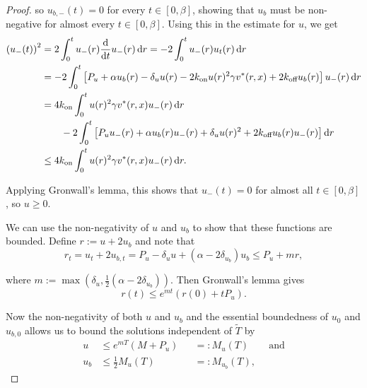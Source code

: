 \begin{proof}
    \noindent
    so $u_{b,-}(t) = 0$ for every $t \in [0, \beta]$, showing that $u_b$ must be non-negative for almost every $t \in [0, \beta]$. Using this in the estimate for $u$, we get
%
    \begin{align*}
        \left( u_{-}(t) \right)^2 &= 2 \int_{0}^{t} u_{-}(r) \frac{\d}{\d t} u_{-}(r)\d r = - 2 \int_{0}^{t} u_{-}(r) u_{t}(r) \d r \\
        &= - 2 \int_{0}^{t} \left[ P_{u} + \alpha u_b(r) - \delta_{u} u(r) - 2 \kon u(r)^2 \gamma v^*(r, x) + 2 \koff u_b(r) \right] u_{-}(r) \d r \\
        &= 4 \kon \int_{0}^{t} u(r)^2 \gamma v^*(r, x)u_{-}(r) \d r \\
        & \qquad - 2 \int_{0}^{t} \left[ P_{u} u_{-}(r) + \alpha u_b(r) u_{-}(r) + \delta_{u} u(r)^2 + 2 \koff u_b(r)u_{-}(r) \right] \d r \\
        &\leq 4 \kon \int_{0}^{t} u(r)^2 \gamma v^*(r, x)u_{-}(r) \d r.
    \end{align*}

    \noindent
    Applying Gronwall's lemma, this shows that $u_-(t) = 0$ for almost all $t \in [0, \beta]$, so $u \geq 0$.
    
    We can use the non-negativity of $u$ and $u_b$ to show that these functions are bounded. Define $r := u + 2 u_b$ and note that
%
    \begin{equation*}
        r_t = u_t + 2 u_{b, t} = P_u - \delta_u u + (\alpha - 2 \delta_{u_b}) u_b \leq P_u + m r,
    \end{equation*}

    \noindent
    where $m := \max\left(\delta_u, \frac{1}{2}(\alpha - 2 \delta_{u_b})\right)$. Then Gronwall's lemma gives
%
    \begin{equation*}
        r(t) \leq e^{mt}\left(r(0) + t P_u\right).
    \end{equation*}

    \noindent
    Now the non-negativity of both $u$ and $u_b$ and the essential boundedness of $u_0$ and $u_{b,0}$ allows us to bound the solutions independent of $\widetilde{T}$ by
%
    \begin{equation}\label{eq:ode_bounds}
    \begin{alignedat}{2}
        u &\leq e^{mT} \left(M + P_u\right) &&=: M_u(T) \qquad \text{and} \\
        u_b &\leq \frac{1}{2} M_u(T) &&=: M_{u_b}(T),
    \end{alignedat}
    \end{equation}


\end{proof}
